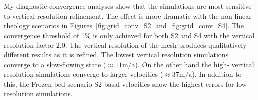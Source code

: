 My diagnostic convergence analyses show that the simulations are most sensitive to vertical resolution refinement. The effect is more dramatic with the non-linear rheology scenarios in Figures~\ref{fig:grid_conv_S2} and~\ref{fig:grid_conv_S4}. The convergence threshold of 1\% is only achieved for both S2 and S4 with the vertical resolution factor $2.0$. The vertical resolution of the mesh produces qualitatively different results as it is refined. The lowest vertical resolution simulations converge to a slow-flowing state ($\approx11 \mathrm{m/a}$). On the other hand the high- vertical resolution simulations converge to larger velocities ($\approx37\mathrm{m/a}$).  In addition to this, the Frozen bed scenario S2 basal velocities show the highest errors for low resolution simulations. 


